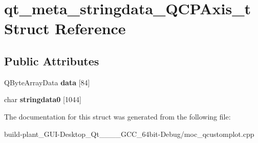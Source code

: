 \hypertarget{structqt__meta__stringdata__QCPAxis__t}{}\section{qt\+\_\+meta\+\_\+stringdata\+\_\+\+Q\+C\+P\+Axis\+\_\+t Struct Reference}
\label{structqt__meta__stringdata__QCPAxis__t}
\subsection*{Public Attributes}
\begin{DoxyCompactItemize}
\item 
\mbox{\label{structqt__meta__stringdata__QCPAxis__t_ad6e7d43321d1d29667d8a964e8b94b03}} 
Q\+Byte\+Array\+Data {\bfseries data} \mbox{[}84\mbox{]}
\item 
\mbox{\label{structqt__meta__stringdata__QCPAxis__t_a69e367a936d5d819080b35c76fe96c11}} 
char {\bfseries stringdata0} \mbox{[}1044\mbox{]}
\end{DoxyCompactItemize}


The documentation for this struct was generated from the following file\+:\begin{DoxyCompactItemize}
\item 
build-\/plant\+\_\+\+G\+U\+I-\/\+Desktop\+\_\+\+Qt\+\_\+\_\+\_\+\_\+\+G\+C\+C\+\_\+64bit-\/\+Debug/moc\+\_\+qcustomplot.\+cpp\end{DoxyCompactItemize}

